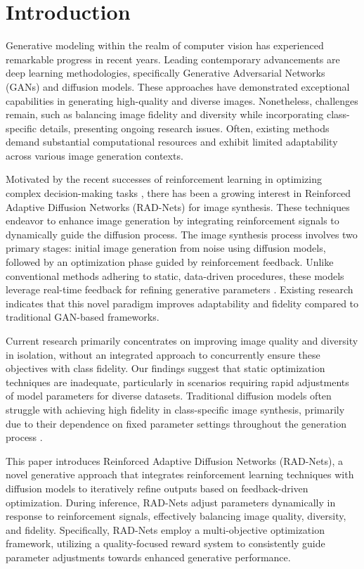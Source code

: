 \section{Introduction}

Generative modeling within the realm of computer vision has experienced remarkable progress in recent years. Leading contemporary advancements are deep learning methodologies, specifically Generative Adversarial Networks (GANs) and diffusion models. These approaches have demonstrated exceptional capabilities in generating high-quality and diverse images. Nonetheless, challenges remain, such as balancing image fidelity and diversity while incorporating class-specific details, presenting ongoing research issues. Often, existing methods demand substantial computational resources and exhibit limited adaptability across various image generation contexts.

Motivated by the recent successes of reinforcement learning in optimizing complex decision-making tasks \cite{lillicrap2015continuous}, there has been a growing interest in Reinforced Adaptive Diffusion Networks (RAD-Nets) for image synthesis. These techniques endeavor to enhance image generation by integrating reinforcement signals to dynamically guide the diffusion process. The image synthesis process involves two primary stages: initial image generation from noise using diffusion models, followed by an optimization phase guided by reinforcement feedback. Unlike conventional methods adhering to static, data-driven procedures, these models leverage real-time feedback for refining generative parameters \cite{ho2020denoising}. Existing research indicates that this novel paradigm improves adaptability and fidelity compared to traditional GAN-based frameworks.

Current research primarily concentrates on improving image quality and diversity in isolation, without an integrated approach to concurrently ensure these objectives with class fidelity. Our findings suggest that static optimization techniques are inadequate, particularly in scenarios requiring rapid adjustments of model parameters for diverse datasets. Traditional diffusion models often struggle with achieving high fidelity in class-specific image synthesis, primarily due to their dependence on fixed parameter settings throughout the generation process \cite{song2020score}.

This paper introduces Reinforced Adaptive Diffusion Networks (RAD-Nets), a novel generative approach that integrates reinforcement learning techniques with diffusion models to iteratively refine outputs based on feedback-driven optimization. During inference, RAD-Nets adjust parameters dynamically in response to reinforcement signals, effectively balancing image quality, diversity, and fidelity. Specifically, RAD-Nets employ a multi-objective optimization framework, utilizing a quality-focused reward system to consistently guide parameter adjustments towards enhanced generative performance.

